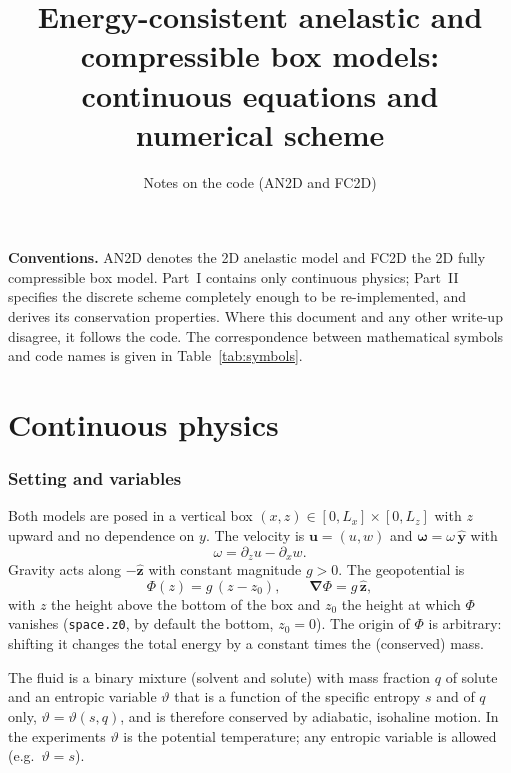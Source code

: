 \documentclass[11pt,a4paper]{article}
\title{Energy-consistent anelastic and compressible box models:\\ continuous equations and numerical scheme}
\author{Notes on the \code{TraceableEnergetics} code (AN2D and FC2D)}
\date{}
\newcommand{\vt}{\vartheta}                    %
\newcommand{\bu}{\mathbf{u}}
\newcommand{\ez}{\hat{\mathbf{z}}}
\newcommand{\bnabla}{\boldsymbol{\nabla}}
\newcommand{\bomega}{\boldsymbol{\omega}}
\newcommand{\code}[1]{\texttt{#1}}
\begin{document}
\maketitle
\tableofcontents

\bigskip
\noindent\textbf{Conventions.}
AN2D denotes the 2D anelastic model and FC2D the 2D fully compressible box model. Part~I contains only continuous physics;
Part~II specifies the discrete scheme completely enough to be re-implemented, and derives its conservation properties.
Where this document and any other write-up disagree, it follows the code. The correspondence between mathematical symbols and code names is given in Table~\ref{tab:symbols}.

\part{Continuous physics}

\section{Setting and variables}
Both models are posed in a vertical box $(x,z)\in[0,L_x]\times[0,L_z]$ with $z$ upward and no dependence on $y$.
The velocity is $\bu=(u,w)$ and $\bomega=\omega\,\hat{\mathbf y}$ with
\begin{equation}
  \omega = \partial_z u - \partial_x w .
\end{equation}
Gravity acts along $-\ez$ with constant magnitude $g>0$. The geopotential is
\begin{equation}
  \Phi(z) = g\,(z - z_0),\qquad \bnabla\Phi = g\,\ez ,
\end{equation}
with $z$ the height above the bottom of the box and $z_0$ the height at which $\Phi$ vanishes (\code{space.z0}, by default the bottom, $z_0=0$). The origin of $\Phi$ is arbitrary: shifting it changes the total energy by a constant times the (conserved) mass.

The fluid is a binary mixture (solvent and solute) with mass fraction $q$ of solute and an entropic
variable $\vt$ that is a function of the specific entropy $s$ and of $q$ only, $\vt=\vt(s,q)$, and is therefore
conserved by adiabatic, isohaline motion. In the experiments $\vt$ is the potential temperature; any entropic variable is allowed
(e.g.\ $\vt=s$).
\end{document}

